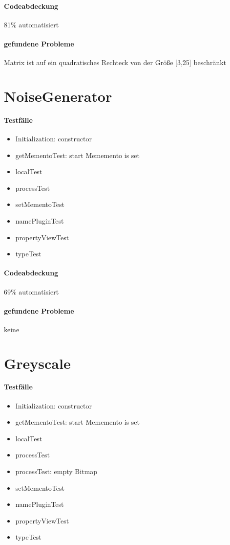\paragraph*{Codeabdeckung}
81\% automatisiert

\paragraph*{gefundene Probleme}
Matrix ist auf ein quadratisches Rechteck von der Größe [3,25] beschränkt

\section{NoiseGenerator}
\paragraph*{Testfälle}
\begin{itemize}
\item Initialization: constructor
\item getMementoTest: start Mememento is set
\item localTest
\item processTest
\item setMementoTest
\item namePluginTest
\item propertyViewTest
\item typeTest
\end{itemize}

\paragraph*{Codeabdeckung}
69\% automatisiert

\paragraph*{gefundene Probleme}
keine

\section{Greyscale}
\paragraph*{Testfälle}
\begin{itemize}
\item Initialization: constructor
\item getMementoTest: start Mememento is set
\item localTest
\item processTest
\item processTest: empty Bitmap
\item setMementoTest
\item namePluginTest
\item propertyViewTest
\item typeTest
\end{itemize}

